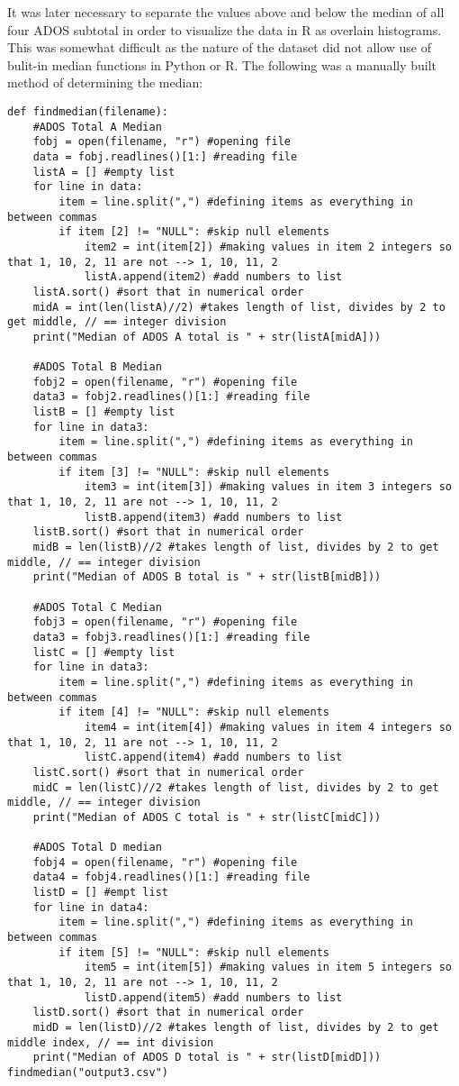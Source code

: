 \documentclass{article}
\begin{document}
It was later necessary to separate the values above and below the median of all four ADOS subtotal in order to visualize the data in R as overlain histograms. This was somewhat difficult as the nature of the dataset did not allow use of bulit-in median functions in Python or R. The following was a manually built method of determining the median: 
\begin{verbatim}
def findmedian(filename):
    #ADOS Total A Median
    fobj = open(filename, "r") #opening file
    data = fobj.readlines()[1:] #reading file
    listA = [] #empty list
    for line in data:
        item = line.split(",") #defining items as everything in between commas
        if item [2] != "NULL": #skip null elements
            item2 = int(item[2]) #making values in item 2 integers so that 1, 10, 2, 11 are not --> 1, 10, 11, 2
            listA.append(item2) #add numbers to list
    listA.sort() #sort that in numerical order
    midA = int(len(listA)//2) #takes length of list, divides by 2 to get middle, // == integer division
    print("Median of ADOS A total is " + str(listA[midA]))
  
    #ADOS Total B Median
    fobj2 = open(filename, "r") #opening file
    data3 = fobj2.readlines()[1:] #reading file
    listB = [] #empty list
    for line in data3:
        item = line.split(",") #defining items as everything in between commas
        if item [3] != "NULL": #skip null elements
            item3 = int(item[3]) #making values in item 3 integers so that 1, 10, 2, 11 are not --> 1, 10, 11, 2
            listB.append(item3) #add numbers to list
    listB.sort() #sort that in numerical order
    midB = len(listB)//2 #takes length of list, divides by 2 to get middle, // == integer division
    print("Median of ADOS B total is " + str(listB[midB]))
    
    #ADOS Total C Median
    fobj3 = open(filename, "r") #opening file
    data3 = fobj3.readlines()[1:] #reading file
    listC = [] #empty list
    for line in data3:
        item = line.split(",") #defining items as everything in between commas
        if item [4] != "NULL": #skip null elements
            item4 = int(item[4]) #making values in item 4 integers so that 1, 10, 2, 11 are not --> 1, 10, 11, 2
            listC.append(item4) #add numbers to list
    listC.sort() #sort that in numerical order
    midC = len(listC)//2 #takes length of list, divides by 2 to get middle, // == integer division
    print("Median of ADOS C total is " + str(listC[midC]))
    
    #ADOS Total D median
    fobj4 = open(filename, "r") #opening file
    data4 = fobj4.readlines()[1:] #reading file
    listD = [] #empt list
    for line in data4:
        item = line.split(",") #defining items as everything in between commas
        if item [5] != "NULL": #skip null elements
            item5 = int(item[5]) #making values in item 5 integers so that 1, 10, 2, 11 are not --> 1, 10, 11, 2
            listD.append(item5) #add numbers to list
    listD.sort() #sort that in numerical order
    midD = len(listD)//2 #takes length of list, divides by 2 to get middle index, // == int division
    print("Median of ADOS D total is " + str(listD[midD]))
findmedian("output3.csv") 
\end{verbatim}
\end{document}
